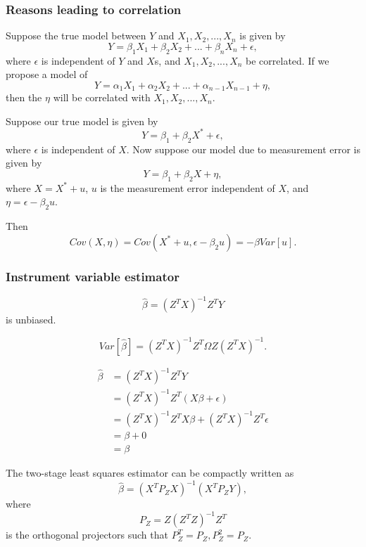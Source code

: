 \begin{refsection}
\subsubsection{Reasons leading to correlation}

\begin{remark}
\cite[407]{hill2008principles}
Suppose the true model between $Y$ and $X_1,X_2,...,X_n$ is given by
$$Y = \beta_1X_1+\beta_2X_2+...+\beta_nX_n + \epsilon,$$
where $\epsilon$ is independent of $Y$ and $X$s, and $X_1,X_2,...,X_n$ be correlated. If we propose a model of 
$$Y = \alpha_1X_1+\alpha_2X_2+...+\alpha_{n-1}X_{n-1} + \eta,$$
then the $\eta$ will be correlated with $X_1,X_2,...,X_n$.	
\end{remark}


\begin{remark}\cite[406]{hill2008principles}
Suppose our true model is given by
$$Y = \beta_1 + \beta_2 X^* + \epsilon,$$
where $\epsilon$ is independent of $X$. Now suppose
our model due to measurement error is given by
$$Y = \beta_1 + \beta_2 X + \eta,$$
where $X = X^* + u$, $u$ is the measurement error independent of $X$, and $\eta = \epsilon - \beta_2 u$.

Then $$Cov(X,\eta) = Cov(X^*+u,\epsilon-\beta_2 u) = -\beta Var[u].$$	
\end{remark}



\subsubsection{Instrument variable estimator}

\begin{lemma}
$$\hat{\beta} = (Z^TX)^{-1}Z^TY$$
is unbiased.

$$Var[\hat{\beta}] = (Z^TX)^{-1}Z^T\Omega Z(Z^TX)^{-1}.$$
\end{lemma}
\begin{align*}
\hat{\beta} &= (Z^TX)^{-1}Z^TY \\
&=(Z^TX)^{-1}Z^T(X\beta + \epsilon) \\
&=(Z^TX)^{-1}Z^TX\beta + (Z^TX)^{-1}Z^T\epsilon \\
&=\beta + 0\\
&=\beta
\end{align*}



\begin{lemma}
The two-stage least squares estimator can be compactly written as
$$\hat{\beta} = (X^TP_ZX)^{-1}(X^TP_ZY),$$
where $$P_Z = Z(Z^TZ)^{-1}Z^T$$
is the orthogonal projectors such that $P_Z^T=P_Z, P_Z^2 = P_Z.$	
\end{lemma}





\end{refsection}
